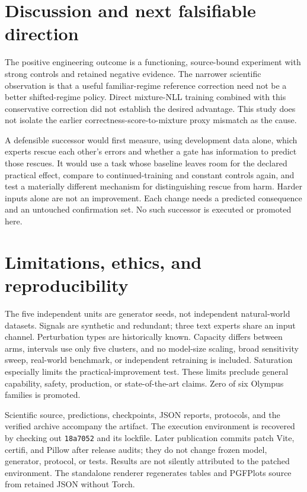 \section{Discussion and next falsifiable direction}
The positive engineering outcome is a functioning, source-bound experiment with
strong controls and retained negative evidence. The narrower scientific
observation is that a useful familiar-regime reference correction need not be
a better shifted-regime policy. Direct mixture-NLL training combined with this
conservative correction did not establish the desired advantage. This study
does not isolate the earlier correctness-score-to-mixture proxy mismatch as
the cause.

A defensible successor would first measure, using development data alone,
which experts rescue each other's errors and whether a gate has information
to predict those rescues. It would use a task whose baseline leaves room for
the declared practical effect, compare to continued-training and constant
controls again, and test a materially different mechanism for distinguishing
rescue from harm. Harder inputs alone are not an improvement. Each change needs
a predicted consequence and an untouched confirmation set. No such successor
is executed or promoted here.

\section{Limitations, ethics, and reproducibility}
The five independent units are generator seeds, not independent natural-world
datasets. Signals are synthetic and redundant; three text experts share an
input channel. Perturbation types are historically known. Capacity differs
between arms, intervals use only five clusters, and no model-size scaling,
broad sensitivity sweep, real-world benchmark, or independent retraining is
included. Saturation especially limits the practical-improvement test. These
limits preclude general capability, safety, production, or state-of-the-art
claims. Zero of six Olympus families is promoted.

Scientific source, predictions, checkpoints, JSON reports, protocols, and the
verified archive accompany the artifact. The execution environment is recovered
by checking out \texttt{18a7052} and its lockfile. Later publication commits
patch Vite, certifi, and Pillow after release audits; they do not change frozen
model, generator, protocol, or tests. Results are not silently attributed to
the patched environment. The standalone renderer regenerates tables and
PGFPlots source from retained JSON without Torch.


